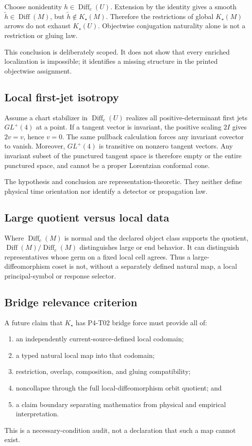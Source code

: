 \documentclass[11pt]{article}
\newcommand{\Diff}{\operatorname{Diff}}
\newcommand{\Diffc}{\operatorname{Diff}_{c}}
\newcommand{\Kstar}{K_{\star}}
\begin{document}
Choose nonidentity \(h\in\Diffc(U)\).  Extension by the identity gives a
smooth \(\widetilde h\in\Diff(M)\), but
\(\widetilde h\notin\Kstar(M)\).  Therefore the restrictions of global
\(\Kstar(M)\) arrows do not exhaust \(\Kstar(U)\).  Objectwise conjugation
naturality alone is not a restriction or gluing law.

This conclusion is deliberately scoped.  It does not show that every enriched
localization is impossible; it identifies a missing structure in the printed
objectwise assignment.

\subsection{Local first-jet isotropy}

Assume a chart stabilizer in \(\Diffc(U)\) realizes all positive-determinant
first jets \(GL^+(4)\) at a point.  If a tangent vector is invariant, the
positive scaling \(2I\) gives \(2v=v\), hence \(v=0\).  The same pullback
calculation forces any invariant covector to vanish.  Moreover,
\(GL^+(4)\) is transitive on nonzero tangent vectors.  Any invariant subset
of the punctured tangent space is therefore empty or the entire punctured
space, and cannot be a proper Lorentzian conformal cone.

The hypothesis and conclusion are representation-theoretic.  They neither
define physical time orientation nor identify a detector or propagation law.

\subsection{Large quotient versus local data}

Where \(\Diffc(M)\) is normal and the declared object class supports the
quotient, \(\Diff(M)/\Diffc(M)\) distinguishes large or end behavior.  It can
distinguish representatives whose germ on a fixed local cell agrees.  Thus a
large-diffeomorphism coset is not, without a separately defined natural map, a
local principal-symbol or response selector.

\subsection{Bridge relevance criterion}

A future claim that \(\Kstar\) has P4-T02 bridge force must provide all of:
\begin{enumerate}
  \item an independently current-source-defined local codomain;
  \item a typed natural local map into that codomain;
  \item restriction, overlap, composition, and gluing compatibility;
  \item noncollapse through the full local-diffeomorphism orbit quotient; and
  \item a claim boundary separating mathematics from physical and empirical
  interpretation.
\end{enumerate}
This is a necessary-condition audit, not a declaration that such a map cannot
exist.
\end{document}
